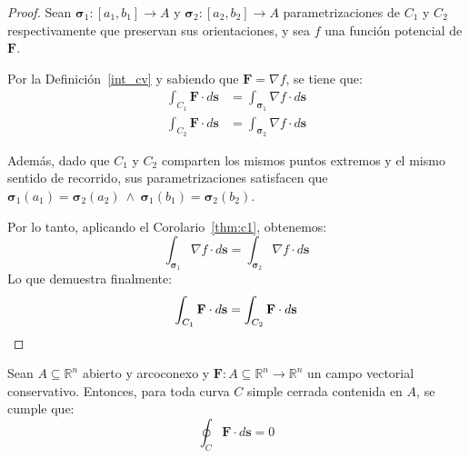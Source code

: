 \begin{proof}
Sean $\boldsymbol{\sigma}_1: [a_1,b_1] \to A$ y $\boldsymbol{\sigma}_2: [a_2,b_2] \to A$ parametrizaciones de $C_1$ y $C_2$ respectivamente que preservan sus orientaciones, y sea $f$ una función potencial de $\mathbf{F}$. 

Por la Definición~\ref{int_cv} y sabiendo que $\mathbf{F} = \nabla f$, se tiene que: 
\begin{align*} 
\int_{C_1} \mathbf{F} \cdot d\mathbf{s} &= \int_{\boldsymbol{\sigma}_1} \nabla f \cdot d\mathbf{s} \\ 
\int_{C_2} \mathbf{F} \cdot d\mathbf{s} &= \int_{\boldsymbol{\sigma}_2} \nabla f \cdot d\mathbf{s} 
\end{align*} 

Además, dado que $C_1$ y $C_2$ comparten los mismos puntos extremos y el mismo sentido de recorrido, sus parametrizaciones satisfacen que $\boldsymbol{\sigma}_1(a_1) = \boldsymbol{\sigma}_2(a_2) \ \land \ \boldsymbol{\sigma}_1(b_1) = \boldsymbol{\sigma}_2(b_2)$. 

Por lo tanto, aplicando el Corolario~\ref{thm:c1}, obtenemos: 
\[ \int_{\boldsymbol{\sigma}_1} \nabla f \cdot d\mathbf{s} = \int_{\boldsymbol{\sigma}_2} \nabla f \cdot d\mathbf{s} \] 
Lo que demuestra finalmente:
\[ \int_{C_1} \mathbf{F} \cdot d\mathbf{s} = \int_{C_2} \mathbf{F} \cdot d\mathbf{s} \qedhere \] 
\end{proof}


\begin{corollary}\label{tmh:c3} 
Sean $A \subseteq \mathbb{R}^n$ abierto y arcoconexo y $\mathbf{F}: A \subseteq \mathbb{R}^n \to \mathbb{R}^n$ un campo vectorial conservativo. Entonces, para toda curva $C$ simple cerrada contenida en $A$, se cumple que: 
\[ \oint_C \mathbf{F} \cdot d\mathbf{s} = 0 \] 
\end{corollary}

